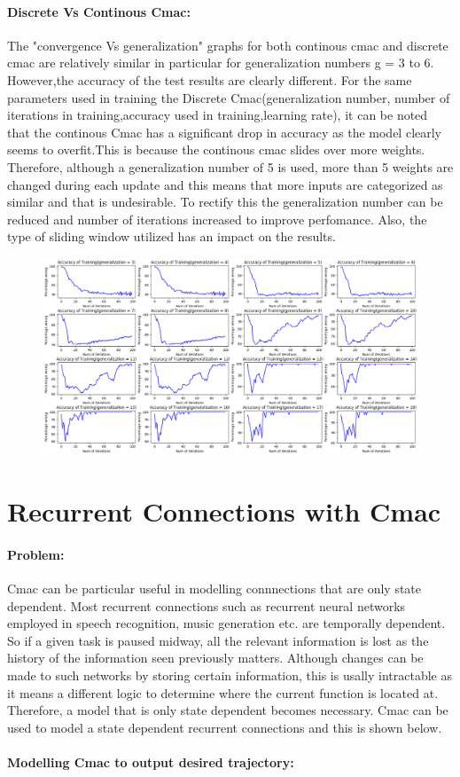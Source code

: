 \documentclass{article}
\begin{document}
  \paragraph{Discrete Vs Continous Cmac:}
  The "convergence Vs generalization" graphs for both continous cmac and discrete cmac are relatively similar in particular for generalization numbers g = 3 to 6. However,the accuracy of the test results  are clearly different.
  For the same parameters used in training the Discrete Cmac(generalization number, number of iterations in training,accuracy used in training,learning rate), it can be noted that the continous Cmac has a significant drop in accuracy as the model clearly seems to overfit.This is because the continous cmac slides over more weights. Therefore, although a generalization number of 5 is used, more than 5 weights are changed during each update and this means that more inputs are categorized as similar and that is undesirable. To rectify this the generalization number can be reduced and number of iterations increased to improve perfomance. Also, the type of sliding window utilized has an impact on the results.  
  \begin{figure}[h!]
    \includegraphics[scale=0.35]{./Results/convergenceVsgeneralizationC.png}
  \end{figure}
\newpage
\section{Recurrent Connections with Cmac}
\paragraph{Problem:}
Cmac can be particular useful in modelling connnections that are only state dependent. Most recurrent connections such as
recurrent neural networks employed in speech recognition, music generation etc. are temporally dependent. So if a given task
is paused midway, all the relevant information is lost as the history of the information seen previously matters.
Although changes can be made to such networks by storing certain information, this is usally intractable as it means a different logic to determine where the current function is located at. 
Therefore, a model that is only state dependent becomes necessary. Cmac can be used to model a state dependent recurrent connections and this is shown below. 

\paragraph{Modelling Cmac to output desired trajectory:} 
\end{document}
